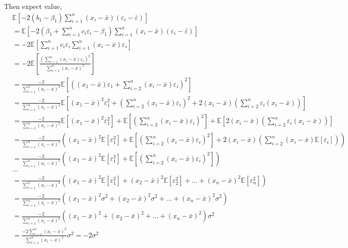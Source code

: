 \documentclass[11pt,letterpaper]{article}
\newcommand\ex{\mathbb{E}}
\newcommand\sumin{\sum_{i=1}^n}
\begin{document}
Then expect value,
\begin{align*}
     &\ex\left[-2 (b_1 - \beta_1) \sumin(x_i - \bar{x}) (\varepsilon_i - \bar{\varepsilon})\right]\\
     &=\ex\left[-2(\beta_1 + \sumin c_i\varepsilon_i - \beta_1 )\sumin(x_i-\bar{x})(\varepsilon_i-\bar{\varepsilon}) \right]\\
    &=-2\ex\left[\sumin c_i\varepsilon_i\sumin(x_i-\bar{x})\varepsilon_i \right]\\
    &= -2\ex\left[\frac{\left(\sumin(x_i-\bar{x})\varepsilon_i\right)^2}{\sumin(x_i-\bar{x})^2}\right]\\
    &=\frac{-2}{\sumin(x_i-\bar{x})^2}\ex\left[\left((x_1-\bar{x})\varepsilon_1 + \sum_{i=2}^{n}(x_i-\bar{x})\varepsilon_i\right)^2\right]\\
    &=\frac{-2}{\sumin(x_i-\bar{x})^2}\ex\left[(x_1-\bar{x})^2\varepsilon_1^2 + \left(\sum_{i=2}^{n}(x_i-\bar{x})\varepsilon_i\right)^2 + 2\left(x_i-\bar{x}\right)\left(\sum_{i=2}^{n}\varepsilon_i(x_i-\bar{x})\right)\right]\\
    &=\frac{-2}{\sumin(x_i-\bar{x})^2}\ex\left[(x_1-\bar{x})^2\varepsilon_1^2\right] + \ex\left[\left(\sum_{i=2}^{n}(x_i-\bar{x})\varepsilon_i\right)^2\right] + \ex\left[2\left(x_i-\bar{x}\right)\left(\sum_{i=2}^{n}\varepsilon_i(x_i-\bar{x})\right)\right]\\
    &=\frac{-2}{\sumin(x_i-\bar{x})^2}\left((x_1-\bar{x})^2\ex\left[\varepsilon_1^2\right] + \ex\left[\left(\sum_{i=2}^{n}(x_i-\bar{x})\varepsilon_i\right)^2\right] + 2\left(x_i-\bar{x}\right)\left(\sum_{i=2}^{n}(x_i-\bar{x})\ex\left[\varepsilon_i\right]\right)\right)\\
    &=\frac{-2}{\sumin(x_i-\bar{x})^2}\left((x_1-\bar{x})^2\ex\left[\varepsilon_1^2\right] + \ex\left[\left(\sum_{i=2}^{n}(x_i-\bar{x})\varepsilon_i\right)^2\right]\right)\\
    &...\\
    &=\frac{-2}{\sumin(x_i-\bar{x})^2}\left((x_1-\bar{x})^2\ex\left[\varepsilon_1^2\right] + (x_2-\bar{x})^2\ex\left[\varepsilon_2^2\right] + ... + (x_n-\bar{x})^2\ex\left[\varepsilon_n^2\right] \right)\\
    &=\frac{-2}{\sumin(x_i-\bar{x})^2}\left((x_1-\bar{x})^2\sigma^2 + (x_2-\bar{x})^2\sigma^2 + ... + (x_n-\bar{x})^2\sigma^2 \right)\\
    &= \frac{-2}{\sumin(x_i-\bar{x})^2}\left((x_1-\bar{x})^2 + (x_2-\bar{x})^2 + ... + (x_n-\bar{x})^2 \right)\sigma^2\\
    &= \frac{-2 \sumin(x_i-\bar{x})^2}{\sumin(x_i-\bar{x})^2}\sigma^2=-2\sigma^2
\end{align*}
\end{document}
